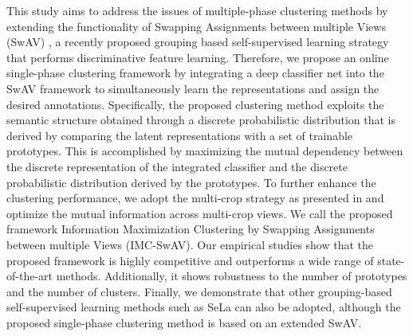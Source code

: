 \documentclass[journal]{IEEEtran}
\begin{document}
This study aims to address the issues of multiple-phase clustering methods by extending the functionality of Swapping Assignments between multiple Views (SwAV) \cite{caron2020unsupervised}, a recently proposed grouping based self-supervised learning strategy that performs discriminative feature learning. Therefore, we propose an online single-phase clustering framework by integrating a deep classifier net into the SwAV framework to simultaneously learn the representations and assign the desired annotations. Specifically, the proposed clustering method exploits the semantic structure obtained through a discrete probabilistic distribution that is derived by comparing the latent representations with a set of trainable prototypes. This is accomplished by maximizing the mutual dependency between the discrete representation of the integrated classifier and the discrete probabilistic distribution derived by the prototypes. To further enhance the clustering performance, we adopt the multi-crop strategy as presented in \cite{caron2020unsupervised} and optimize the mutual information across multi-crop views. We call the proposed framework Information Maximization Clustering by Swapping Assignments between multiple Views (IMC-SwAV). Our empirical studies show that the proposed framework is highly competitive and outperforms a wide range of state-of-the-art methods. Additionally, it shows robustness to the number of prototypes and the number of clusters. Finally, we demonstrate that other grouping-based self-supervised learning methods such as SeLa \cite{asano2020self} can also be adopted, although the proposed single-phase clustering method is based on an extended SwAV. 
\end{document}
